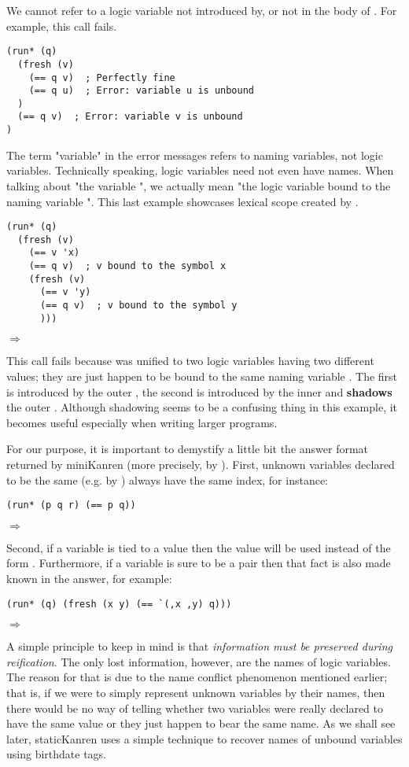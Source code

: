 We cannot refer to a logic variable not introduced by, or not in the body of . For example, this call fails.
\begin{lstlisting}
(run* (q)
  (fresh (v)
    (== q v)  ; Perfectly fine
    (== q u)  ; Error: variable u is unbound
  )
  (== q v)  ; Error: variable v is unbound
)
\end{lstlisting}
The term "variable" in the error messages refers to naming variables, not logic variables. Technically speaking, logic variables need not even have names. When talking about "the variable ", we actually mean "the logic variable bound to the naming variable ". This last example showcases lexical scope created by .
\begin{lstlisting}
(run* (q)
  (fresh (v)
    (== v 'x)
    (== q v)  ; v bound to the symbol x
    (fresh (v)
      (== v 'y)
      (== q v)  ; v bound to the symbol y
      )))
\end{lstlisting}
$\Rightarrow$ \code{()}

This call fails because  was unified to two logic variables having two different values; they are just happen to be bound to the same naming variable . The first  is introduced by the outer , the second  is introduced by the inner  and \textbf{shadows} the outer . Although shadowing seems to be a confusing thing in this example, it becomes useful especially when writing larger programs.

For our purpose, it is important to demystify a little bit the answer format returned by miniKanren (more precisely, by ). First, unknown variables declared to be the same (e.g. by \code{==}) always have the same index, for instance:
\begin{lstlisting}
(run* (p q r) (== p q))
\end{lstlisting}
$\Rightarrow$ 

Second, if a variable is tied to a value then the value will be used instead of the form . Furthermore, if a variable is sure to be a pair then that fact is also made known in the answer, for example:
\begin{lstlisting}
(run* (q) (fresh (x y) (== `(,x ,y) q)))
\end{lstlisting}
$\Rightarrow$ 

A simple principle to keep in mind is that \textit{information must be preserved during reification}. The only lost information, however, are the names of logic variables. The reason for that is due to the name conflict phenomenon mentioned earlier; that is, if we were to simply represent unknown variables by their names, then there would be no way of telling whether two variables were really declared to have the same value or they just happen to bear the same name. As we shall see later, staticKanren uses a simple technique to recover names of unbound variables using birthdate tags.

